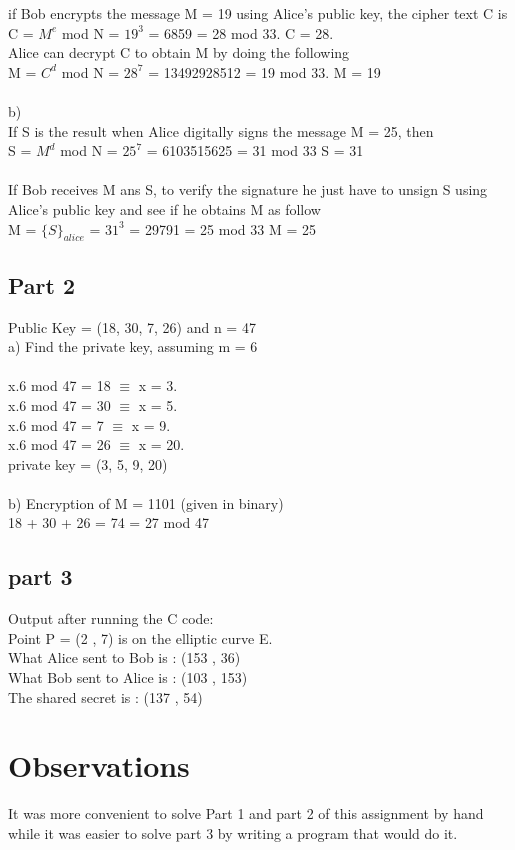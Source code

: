 \documentclass[12pt]{article}
\begin{document}
				if Bob encrypts the message M = 19 using Alice's public key, the cipher text C is \\
				C = $M^{e}$ mod N = $19^{3}$ = 6859 = 28 mod 33. {\color{red} C = 28.} \\
				Alice can decrypt C to obtain M by doing the following \\
				M = $C^{d}$ mod N = $28^{7}$ = 13492928512 = 19 mod 33. {\color{red} M = 19}\\\\
			b)\\
			
				If S is the result when Alice  digitally signs the message M = 25, then\\
				S = $M^{d}$ mod N = $25^{7}$ = 6103515625 = 31 mod 33 {\color{red} S = 31}\\\\
				
				If Bob receives M ans S, to verify the signature he just have to unsign S using Alice's public key and see if he obtains M as follow\\
				M = $\{S\}_{alice}$ = $31^{3}$ = 29791 = 25 mod 33 {\color{red} M = 25} 
				
		
		\subsection{Part 2}
			
			Public Key = (18, 30, 7, 26) and n = 47\\
			
			a) Find the private key, assuming m = 6\\\\
				x.6 mod 47 = 18  $\equiv$ x = 3.\\
				x.6 mod 47 = 30  $\equiv$ x = 5.\\
				x.6 mod 47 = 7  $\equiv$ x = 9.\\
				x.6 mod 47 = 26  $\equiv$ x = 20.\\
				
				{\color{red} private key = (3, 5, 9, 20)}\\\\
				
			b) Encryption of M = 1101 (given in binary)\\
			
				18 + 30 + 26 = 74 = {\color{red} 27 mod 47}
				
			\subsection{part 3}
			Output after running the C code:\\
			Point P = (2 , 7) is on the elliptic curve E.\\
			What Alice sent to Bob is : (153 , 36)\\
			What Bob sent to Alice is : (103 , 153)\\
			The shared secret is : (137 , 54)\\
			
				
		
		\section{Observations}
		It was more convenient to solve Part 1 and part 2 of this assignment by hand while it was easier to solve part 3 by writing a program that would do it.
	
	
\end{document}
